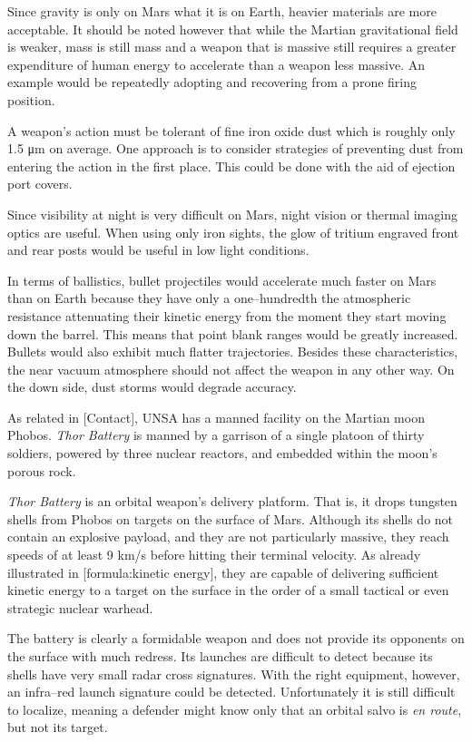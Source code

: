 Since gravity is only  on Mars what it is on Earth, heavier materials are more acceptable. It should be noted however that while the Martian gravitational field is weaker, mass is still mass and a weapon that is massive still requires a greater expenditure of human energy to accelerate than a weapon less massive. An example would be repeatedly adopting and recovering from a prone firing position.

A weapon's action must be tolerant of fine iron oxide dust which is roughly only 1.5 μm on average. One approach is to consider strategies of preventing dust from entering the action in the first place. This could be done with the aid of ejection port covers.

Since visibility at night is very difficult on Mars, night vision or thermal imaging optics are useful. When using only iron sights, the glow of tritium engraved front and rear posts would be useful in low light conditions.

In terms of ballistics, bullet projectiles would accelerate much faster on Mars than on Earth because they have only a one--hundredth the atmospheric resistance attenuating their kinetic energy from the moment they start moving down the barrel. This means that point blank ranges would be greatly increased. Bullets would also exhibit much flatter trajectories. Besides these characteristics, the near vacuum atmosphere should not affect the weapon in any other way. On the down side, dust storms would degrade accuracy. 


As related in [Contact], UNSA has a manned facility on the Martian moon Phobos. {\it Thor Battery} is manned by a garrison of a single platoon of thirty soldiers, powered by three nuclear reactors, and embedded within the moon's porous rock.

{\it Thor Battery} is an orbital weapon's delivery platform. That is, it drops tungsten shells from Phobos on targets on the surface of Mars. Although its shells do not contain an explosive payload, and they are not particularly massive, they reach speeds of at least 9 km/s before hitting their terminal velocity. As already illustrated in [formula:kinetic energy], they are capable of delivering sufficient kinetic energy to a target on the surface in the order of a small tactical or even strategic nuclear warhead.

The battery is clearly a formidable weapon and does not provide its opponents on the surface with much redress. Its launches are difficult to detect because its shells have very small radar cross signatures. With the right equipment, however, an infra--red launch signature could be detected. Unfortunately it is still difficult to localize, meaning a defender might know only that an orbital salvo is {\it en route}, but not its target. 

